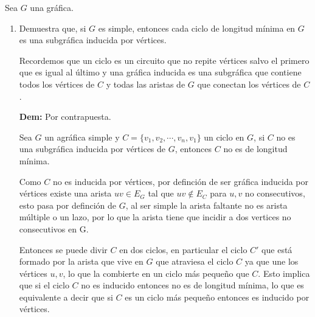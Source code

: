 Sea $G$ una gráfica.
\begin{enumerate}
    \item Demuestra que, si $G$ es simple, entonces cada ciclo de longitud mínima en $G$ es una subgráfica inducida por vértices.

          Recordemos que un ciclo es un circuito que no repite vértices salvo el primero que es igual al último y una gráfica inducida es una subgráfica que contiene todos los vértices de $C$ y todas las aristas de $G$ que conectan los vértices de $C$.


          \textbf{Dem:} Por contrapuesta.

          Sea $G$ un agráfica simple y $C=\{v_1,v_2,\cdots,v_n,v_1\}$ un ciclo en $G$, si $C$ no es una subgráfica inducida por vértices de $G$, entonces $C$ no es de longitud mínima.

          Como $C$ no es inducida por vértices, por definción de ser gráfica inducida por vértices existe una arista $uv\in E_G$ tal que $uv\notin E_C$ para $u,v$ no consecutivos, esto pasa por definción de $G$, al ser simple la arista faltante no es arista múltiple o un lazo, por lo que la arista tiene que incidir a dos vertices no consecutivos en G.

          Entonces se puede divir $C$ en dos ciclos, en particular el ciclo $C'$ que está formado por la arista que vive en $G$ que atraviesa el ciclo $C$ ya que une los vértices $u,v$, lo que la combierte en un ciclo más pequeño que $C$. Esto implica que si el ciclo $C$ no es inducido entonces no es de longitud mínima, lo que es equivalente a decir que si $C$ es un ciclo más pequeño entonces es inducido por vértices.



\end{enumerate}
